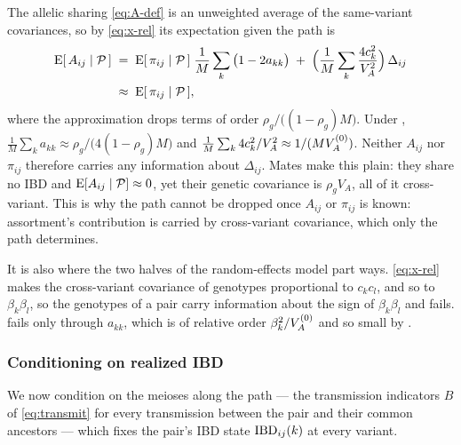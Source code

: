 \documentclass[12pt]{article}
\begin{document}
The allelic sharing \eqref{eq:A-def} is an unweighted average of the same-variant covariances, so by \eqref{eq:x-rel} its expectation given the path is
\begin{equation}\label{eq:A-given-path}
    \begin{aligned}
    \mathrm{E}[\,A_{ij} \mid \mathcal{P}\,]
    \;&=\; \mathrm{E}[\,\pi_{ij} \mid \mathcal{P}\,]\;\frac1M\sum_k \big(1 - 2a_{kk}\big) \;+\; \Big(\frac1M\sum_k \frac{4c_k^2}{V_A^2}\Big)\,\Delta_{ij} \\
    \;&\approx\; \mathrm{E}[\,\pi_{ij} \mid \mathcal{P}\,] ,
    \end{aligned}
\end{equation}
where the approximation drops terms of order $\rho_g/\big((1-\rho_g)M\big)$.
Under , $\tfrac1M\sum_k a_{kk} \approx \rho_g/\big(4(1-\rho_g)M\big)$ and $\tfrac1M\sum_k 4c_k^2/V_A^2 \approx 1/(MV_A^{(0)})$.
Neither $A_{ij}$ nor $\pi_{ij}$ therefore carries any information about $\Delta_{ij}$.
Mates make this plain: they share no IBD and $\mathrm{E}[A_{ij} \mid \mathcal{P}] \approx 0$, yet their genetic covariance is $\rho_g V_A$, all of it cross-variant.
This is why the path cannot be dropped once $A_{ij}$ or $\pi_{ij}$ is known: assortment's contribution is carried by cross-variant covariance, which only the path determines.

It is also where the two halves of the random-effects model part ways.
\eqref{eq:x-rel} makes the cross-variant covariance of genotypes proportional to $c_k c_l$, and so to $\beta_k\beta_l$, so the genotypes of a pair carry information about the sign of $\beta_k\beta_l$ and  fails.
 fails only through $a_{kk}$, which is of relative order $\beta_k^2/V_A^{(0)}$ and so small by .

\subsubsection{Conditioning on realized IBD}\label{sec:am-cond-ibd}
We now condition on the meioses along the path --- the transmission indicators $B$ of \eqref{eq:transmit} for every transmission between the pair and their common ancestors --- which fixes the pair's IBD state $\mathrm{IBD}_{ij}(k)$ at every variant.
\end{document}
